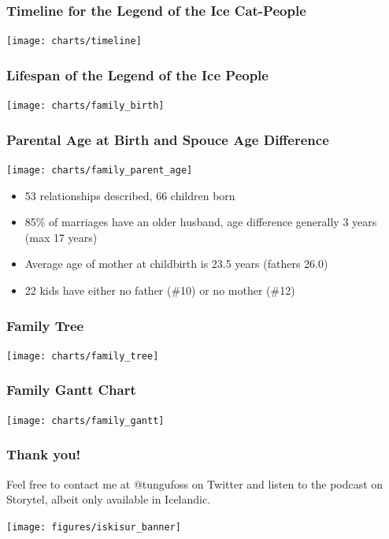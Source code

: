 \documentclass{beamer}
\begin{document}
    \begin{frame}
        \frametitle{Timeline for the Legend of the Ice Cat-People}
        \texttt{[image: charts/timeline]}
    \end{frame}

    \begin{frame}
        \frametitle{Lifespan of the Legend of the Ice People}
        \texttt{[image: charts/family\_birth]}

    \end{frame}

    \begin{frame}
        \frametitle{Parental Age at Birth and Spouce Age Difference}
        \texttt{[image: charts/family\_parent\_age]}

        \begin{itemize}
            \item 53 relationships described, 66 children born
            \item 85\% of marriages have an older husband, age difference generally 3 years (max 17 years)
            \item Average age of mother at childbirth is 23.5 years (fathers 26.0)
            \item 22 kids have either no father (\#10) or no mother (\#12)
        \end{itemize}


    \end{frame}

    \begin{frame}
        \frametitle{Family Tree}
        \centering
        \texttt{[image: charts/family\_tree]}
    \end{frame}

    \begin{frame}
        \frametitle{Family Gantt Chart}
        \texttt{[image: charts/family\_gantt]}
    \end{frame}


    \begin{frame}

    \end{frame}

    \begin{frame}
        \frametitle{Thank you!}
        Feel free to contact me at @tungufoss on Twitter and listen to the podcast on Storytel, albeit only available
        in Icelandic.

        \vspace{24pt}
        \texttt{[image: figures/iskisur\_banner]}

    \end{frame}
\end{document}
